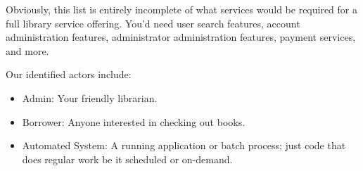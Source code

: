 Obviously, this list is entirely incomplete of what services would be required for a full library service offering.  You'd need user search features, account administration features, administrator administration features, payment services, and more.

Our identified actors include:

\begin{itemize}
  \item Admin: Your friendly librarian.
  \item Borrower: Anyone interested in checking out books.
  \item Automated System: A running application or batch process; just code that does regular work be it scheduled or on-demand.
\end{itemize}
